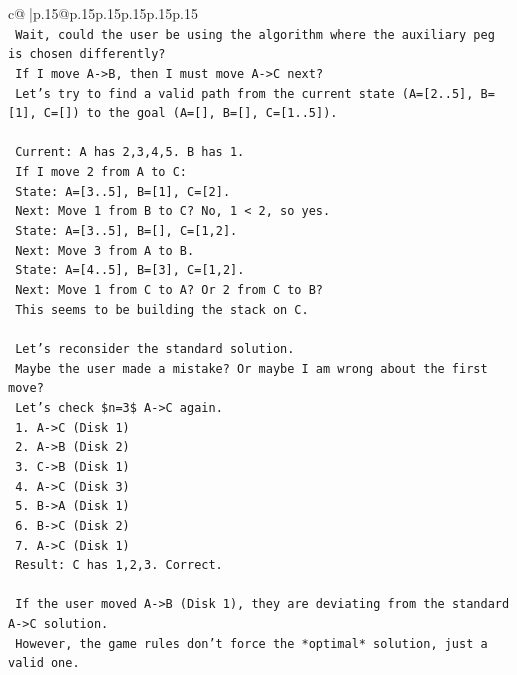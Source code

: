 \documentclass{article}
\begin{document}
{\begin{supertabular}{c@{$\;$}|p{.15\linewidth}@{}p{.15\linewidth}p{.15\linewidth}p{.15\linewidth}p{.15\linewidth}p{.15\linewidth}}
{{{\\ 
\texttt{    Wait, could the user be using the algorithm where the auxiliary peg is chosen differently?} \\
\texttt{    If I move A{-}>B, then I must move A{-}>C next?} \\
\texttt{    Let's try to find a valid path from the current state (A={[}2..5{]}, B={[}1{]}, C={[}{]}) to the goal (A={[}{]}, B={[}{]}, C={[}1..5{]}).} \\
\\ 
\texttt{    Current: A has 2,3,4,5. B has 1.} \\
\texttt{    If I move 2 from A to C:} \\
\texttt{    State: A={[}3..5{]}, B={[}1{]}, C={[}2{]}.} \\
\texttt{    Next: Move 1 from B to C? No, 1 < 2, so yes.} \\
\texttt{    State: A={[}3..5{]}, B={[}{]}, C={[}1,2{]}.} \\
\texttt{    Next: Move 3 from A to B.} \\
\texttt{    State: A={[}4..5{]}, B={[}3{]}, C={[}1,2{]}.} \\
\texttt{    Next: Move 1 from C to A? Or 2 from C to B?} \\
\texttt{    This seems to be building the stack on C.} \\
\\ 
\texttt{    Let's reconsider the standard solution.} \\
\texttt{    Maybe the user made a mistake? Or maybe I am wrong about the first move?} \\
\texttt{    Let's check \$n=3\$ A{-}>C again.} \\
\texttt{    1. A{-}>C (Disk 1)} \\
\texttt{    2. A{-}>B (Disk 2)} \\
\texttt{    3. C{-}>B (Disk 1)} \\
\texttt{    4. A{-}>C (Disk 3)} \\
\texttt{    5. B{-}>A (Disk 1)} \\
\texttt{    6. B{-}>C (Disk 2)} \\
\texttt{    7. A{-}>C (Disk 1)} \\
\texttt{    Result: C has 1,2,3. Correct.} \\
\\ 
\texttt{    If the user moved A{-}>B (Disk 1), they are deviating from the standard A{-}>C solution.} \\
\texttt{    However, the game rules don't force the *optimal* solution, just a valid one.} \\
}}}
\end{supertabular}}
\end{document}

